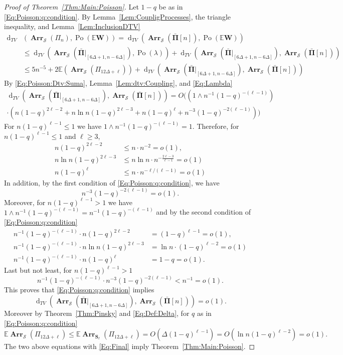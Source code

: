 \documentclass[letterpaper,11pt]{article}
\theoremstyle{definition}
\theoremstyle{remark}
\renewcommand{\le}{\leqslant}
\renewcommand{\ge}{\geqslant}
\newcommand{\bE}{\mathbb{E}}
\newcommand{\bS}{\mathbf{S}}
\newcommand{\Arr}{\ensuremath{\operatorname{\mathbf{Arr}}}}
\newcommand{\barPi}{\bar {\mathbf \Pi}}
\newcommand{\cS}{\mathcal{S}}
\newcommand{\dtv}{\operatorname{d}_{TV}}
\newcommand{\bW}{\mathbf{W}}
\begin{document}
\begin{proof}[Proof of Theorem~\ref{Thm:Main:Poisson}] Let $1-q$ be as in \eqref{Eq:Poisson:q:condition}. 
	By Lemma~\ref{Lem:CoupligProcesses}, the triangle inequality, and Lemma~\ref{Lem:InclusionDTV}
	\begin{align}
		\nonumber
		\dtv&\left(
		\Arr_{\cS}(\varPi_n),\operatorname{Po}(\bE \bW)
		\right)
		=\dtv\left(
		\Arr_{\cS}(\barPi[n]),\operatorname{Po}(\bE \bW)
		\right)\\ \nonumber
		&\le
		\dtv\left(\Arr_{\cS}(\barPi|_{[6\Delta+1,n-6\Delta]}),\operatorname{Po}(\lambda)\right)+
		\dtv\left(\Arr_{\cS}(\barPi|_{[6\Delta+1,n-6\Delta]}),\Arr_{\cS}(\barPi[n])\right)\\
		&\le 5n^{-5}+2\bE(\Arr_{\cS}(\varPi_{12\Delta+\ell}))+\dtv\left(\Arr_{\cS}(\barPi|_{[6\Delta+1,n-6\Delta]}),\Arr_{\cS}(\barPi[n])\right)\label{Eq:Final}
	\end{align}
	By \eqref{Eq:Poisson:Dtv:Suma}, Lemma~\ref{Lem:dtv:Coupling}, and \eqref{Eq:Lambda}
	\begin{multline}
		\dtv\left(\Arr_{\cS}(\barPi|_{[6\Delta+1,n-6\Delta]}),\Arr_{\cS}(\barPi[n])\right)
		=O((1\wedge n^{-1}(1-q)^{-(\ell-1)})\\
		\cdot(n(1-q)^{2\ell-2}+n\ln n(1-q)^{2\ell-3}+n(1-q)^{\ell}+n^{-3}(1-q)^{-2(\ell-1)}))
	\end{multline}
	For $n(1-q)^{\ell-1}\le 1$ we have $1\wedge n^{-1}(1-q)^{-(\ell-1)}=1$. Therefore, for $n(1-q)^{\ell-1}\le 1$ and $\ell\ge 3$,
	\begin{align*}
		n(1-q)^{2\ell-2}&\le n\cdot n^{-2} = o(1),\\
		n\ln n(1-q)^{2\ell-3}&\le n\ln n \cdot n^{-\frac{2\ell-3}{\ell-1}}=o(1)\\
		n(1-q)^{\ell}&\le n\cdot n^{-\ell/(\ell-1)} = o(1)
	\end{align*}
	In addition, by the first condition of \eqref{Eq:Poisson:q:condition}, we have
	\[n^{-3}(1-q)^{-2(\ell-1)}=o(1).\]
	Moreover, for  $n(1-q)^{\ell-1} > 1$ we have $1\wedge n^{-1}(1-q)^{-(\ell-1)}=n^{-1}(1-q)^{-(\ell-1)}$ and by the second condition of \eqref{Eq:Poisson:q:condition}
	\begin{align*}
		n^{-1}(1-q)^{-(\ell-1)}\cdot n(1-q)^{2\ell-2}&=(1-q)^{\ell-1}=o(1),\\
		n^{-1}(1-q)^{-(\ell-1)}\cdot n\ln n(1-q)^{2\ell-3}&= \ln n \cdot (1-q)^{\ell-2}=o(1)\\
		n^{-1}(1-q)^{-(\ell-1)}\cdot n(1-q)^{\ell}&=1-q= o(1).
	\end{align*}
	Last but not least, for  $n(1-q)^{\ell-1} > 1$
	\[n^{-1}(1-q)^{-(\ell-1)}\cdot n^{-3}(1-q)^{-2(\ell-1)}<n^{-1}=o(1).\]
	This proves that \eqref{Eq:Poisson:q:condition} implies
	\[\dtv\left(\Arr_{\cS}(\barPi|_{[6\Delta+1,n-6\Delta]}),\Arr_{\cS}(\barPi[n])\right)=o(1).\]
	Moreover by Theorem~\ref{Thm:Pinsky} and \eqref{Eq:Def:Delta}, for $q$ as in \eqref{Eq:Poisson:q:condition} \[\bE\Arr_{\cS}(\varPi_{12\Delta+\ell})\le \bE\Arr_{\bS_\ell}(\varPi_{12\Delta+\ell})= O(\Delta(1-q)^{\ell-1}) = O\left(\ln n (1-q)^{\ell-2}\right)=o(1). \]
	The two above equations with \eqref{Eq:Final} imply Theorem~\ref{Thm:Main:Poisson}. 
	
	
\end{proof}
\end{document}
